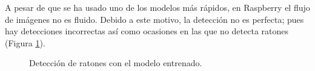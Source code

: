 A pesar de que se ha usado uno de los modelos más rápidos, en Raspberry el flujo de imágenes no es fluido. Debido a este motivo, la detección no es perfecta; pues hay detecciones incorrectas así como ocasiones en las que no detecta ratones (Figura \ref{fig:detec}).
\begin{figure}[h!]
  \begin{center}
    \hspace{1mm}
    \hspace{1mm}
    \hspace{1mm}
  \end{center}
\caption{Detección de ratones con el modelo entrenado.} \label{fig:detec}
\end{figure}
